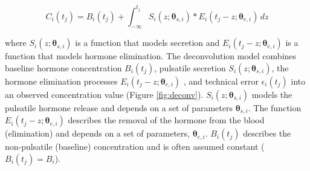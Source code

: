 \documentclass[11pt]{book}
\begin{document}

$$
C_i(t_j) = B_i(t_j) + \int_{-\infty}^{t_j} S_i(z;\boldsymbol{\theta}_{s,i})*E_i(t_j - z;\boldsymbol{\theta}_{e,i})\,dz
$$


\noindent where $S_i(z;\boldsymbol{\theta}_{s,i})$ is a function that models secretion and $E_i(t_j-z;\boldsymbol{\theta}_{e,i})$ is a function that models hormone elimination. The deconvolution model combines baseline hormone concentration $B_i(t_j)$, pulsatile secretion $S_i(z;\boldsymbol{\theta}_{s,i})$, the hormone elimination processes $E_i(t_j - z;\boldsymbol{\theta}_{e,i})$ , and technical error $\epsilon_i(t_j)$ into an observed concentration value (Figure \ref{fig:deconv}). $S_i(z;\boldsymbol{\theta}_{s,i})$ models the pulsatile hormone release and depends on a set of parameters $\boldsymbol{\theta}_{s,i}$. The function $E_i(t_j - z;\boldsymbol{\theta}_{e,i})$ describes the removal of the hormone from the blood (elimination) and depends on a set of parameters, $\boldsymbol{\theta}_{e,i}$. $B_i(t_j)$ describes the non-pulsatile (baseline) concentration and is often assumed constant ($B_i(t_j) = B_i$).
\newpage
\end{document}
